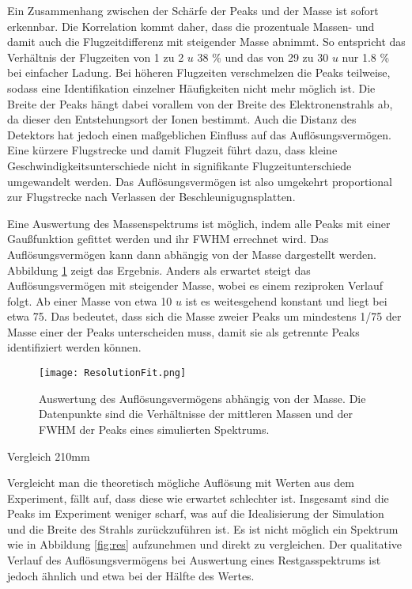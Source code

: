 Ein Zusammenhang zwischen der Schärfe der Peaks und der Masse ist sofort erkennbar. Die Korrelation kommt daher, dass die prozentuale Massen- und damit auch die Flugzeitdifferenz mit steigender Masse abnimmt. So entspricht das Verhältnis der Flugzeiten von 1 zu 2 $u$ 38 \% und das von 29 zu 30 $u$ nur 1.8 \% bei einfacher Ladung. Bei höheren Flugzeiten verschmelzen die Peaks teilweise, sodass eine Identifikation einzelner Häufigkeiten nicht mehr möglich ist. Die Breite der Peaks hängt dabei vorallem von der Breite des Elektronenstrahls ab, da dieser den Entstehungsort der Ionen bestimmt. Auch die Distanz des Detektors hat jedoch einen maßgeblichen Einfluss auf das Auflösungsvermögen. Eine kürzere Flugstrecke und damit Flugzeit führt dazu, dass kleine Geschwindigkeitsunterschiede nicht in signifikante Flugzeitunterschiede umgewandelt werden. Das Auflösungsvermögen ist also umgekehrt proportional zur Flugstrecke nach Verlassen der Beschleunigugnsplatten.

Eine Auswertung des Massenspektrums ist möglich, indem alle Peaks mit einer Gaußfunktion gefittet werden und ihr FWHM errechnet wird. Das Auflösungsvermögen kann dann abhängig von der Masse dargestellt werden. Abbildung \ref{fig:res_fit} zeigt das Ergebnis. Anders als erwartet steigt das Auflösungsvermögen mit steigender Masse, wobei es einem reziproken Verlauf folgt. Ab einer Masse von etwa 10 $u$ ist es weitesgehend konstant und liegt bei etwa 75. Das bedeutet, dass sich die Masse zweier Peaks um mindestens 1/75 der Masse einer der Peaks unterscheiden muss, damit sie als getrennte Peaks identifiziert werden können.

\begin{figure}
    \centering
    \texttt{[image: ResolutionFit.png]}
    \caption[Auswertung des Auflösungsvermögens abhängig von der Masse]{Auswertung des Auflösungsvermögens abhängig von der Masse. Die Datenpunkte sind die Verhältnisse der mittleren Massen und der FWHM der Peaks eines simulierten Spektrums.}
    \label{fig:res_fit}
\end{figure}

Vergleich 210mm

Vergleicht man die theoretisch mögliche Auflösung mit Werten aus dem Experiment, fällt auf, dass diese wie erwartet schlechter ist. Insgesamt sind die Peaks im Experiment weniger scharf, was auf die Idealisierung der Simulation und die Breite des Strahls zurückzuführen ist. Es ist nicht möglich ein Spektrum wie in Abbildung \ref{fig:res} aufzunehmen und direkt zu vergleichen. Der qualitative Verlauf des Auflösungsvermögens bei Auswertung eines Restgasspektrums ist jedoch ähnlich und etwa bei der Hälfte des Wertes.

